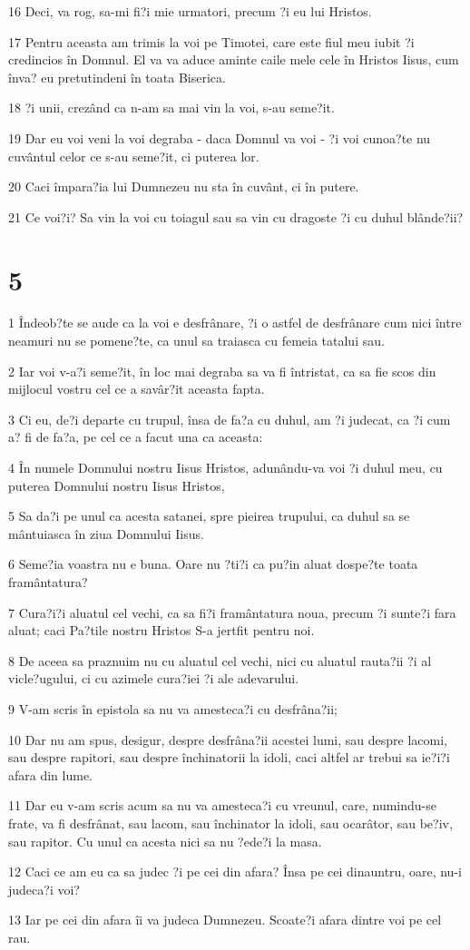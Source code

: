 \par 16 Deci, va rog, sa-mi fi?i mie urmatori, precum ?i eu lui Hristos.
\par 17 Pentru aceasta am trimis la voi pe Timotei, care este fiul meu iubit ?i credincios în Domnul. El va va aduce aminte caile mele cele în Hristos Iisus, cum înva? eu pretutindeni în toata Biserica.
\par 18 ?i unii, crezând ca n-am sa mai vin la voi, s-au seme?it.
\par 19 Dar eu voi veni la voi degraba - daca Domnul va voi - ?i voi cunoa?te nu cuvântul celor ce s-au seme?it, ci puterea lor.
\par 20 Caci împara?ia lui Dumnezeu nu sta în cuvânt, ci în putere.
\par 21 Ce voi?i? Sa vin la voi cu toiagul sau sa vin cu dragoste ?i cu duhul blânde?ii?

\chapter{5}

\par 1 Îndeob?te se aude ca la voi e desfrânare, ?i o astfel de desfrânare cum nici între neamuri nu se pomene?te, ca unul sa traiasca cu femeia tatalui sau.
\par 2 Iar voi v-a?i seme?it, în loc mai degraba sa va fi întristat, ca sa fie scos din mijlocul vostru cel ce a savâr?it aceasta fapta.
\par 3 Ci eu, de?i departe cu trupul, însa de fa?a cu duhul, am ?i judecat, ca ?i cum a? fi de fa?a, pe cel ce a facut una ca aceasta:
\par 4 În numele Domnului nostru Iisus Hristos, adunându-va voi ?i duhul meu, cu puterea Domnului nostru Iisus Hristos,
\par 5 Sa da?i pe unul ca acesta satanei, spre pieirea trupului, ca duhul sa se mântuiasca în ziua Domnului Iisus.
\par 6 Seme?ia voastra nu e buna. Oare nu ?ti?i ca pu?in aluat dospe?te toata framântatura?
\par 7 Cura?i?i aluatul cel vechi, ca sa fi?i framântatura noua, precum ?i sunte?i fara aluat; caci Pa?tile nostru Hristos S-a jertfit pentru noi.
\par 8 De aceea sa praznuim nu cu aluatul cel vechi, nici cu aluatul rauta?ii ?i al vicle?ugului, ci cu azimele cura?iei ?i ale adevarului.
\par 9 V-am scris în epistola sa nu va amesteca?i cu desfrâna?ii;
\par 10 Dar nu am spus, desigur, despre desfrâna?ii acestei lumi, sau despre lacomi, sau despre rapitori, sau despre închinatorii la idoli, caci altfel ar trebui sa ie?i?i afara din lume.
\par 11 Dar eu v-am scris acum sa nu va amesteca?i cu vreunul, care, numindu-se frate, va fi desfrânat, sau lacom, sau închinator la idoli, sau ocarâtor, sau be?iv, sau rapitor. Cu unul ca acesta nici sa nu ?ede?i la masa.
\par 12 Caci ce am eu ca sa judec ?i pe cei din afara? Însa pe cei dinauntru, oare, nu-i judeca?i voi?
\par 13 Iar pe cei din afara îi va judeca Dumnezeu. Scoate?i afara dintre voi pe cel rau.

